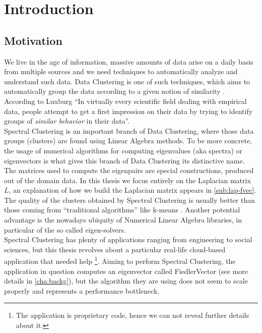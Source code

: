 \chapter{Introduction}

\section{Motivation}

We live in the age of information, massive amounts of data arise on a
daily basis from multiple sources and we need techniques to
automatically analyze and understand such data. Data Clustering is one
of such techniques, which aims to automatically group the data
according to a given notion of similarity \cite{pang06}. According to
Luxburg \cite{luxburg07} ``In virtually every  
scientific field dealing with empirical data, people attempt to get a
first impression on their data by
trying to identify groups of \emph{similar behavior} in their
data''. \\

Spectral Clustering is an important branch of Data Clustering, where
those data groups (clusters) are found using Linear Algebra
methods. To be more concrete, the usage of numerical algorithms for computing
eigenvalues (aka spectra) or eigenvectors is what gives this branch of
Data Clustering its distinctive  name. The matrices used to compute the
eigenpairs are special constructions, produced out of the domain
data. In this thesis we focus entirely on the \gls{Laplacian} matrix
$L$, an explanation of how we build the 
\gls{Laplacian} matrix appears in \cref{sub:lap-fvec}. \\

The quality of the clusters obtained by Spectral Clustering 
is usually better than those coming from ``traditional algorithms''
like k-means \cite{luxburg07}. Another potential advantage is the
nowadays ubiquity of Numerical Linear Algebra libraries, in particular
of the so called eigen-solvers. \\

Spectral Clustering has plenty of applications ranging from
engineering to social sciences, but this  
thesis revolves about a particular real-life cloud-based application
that needed help \footnote{The application is proprietary code, hence
  we can not 
  reveal further details about it.}. Aiming to perform Spectral
Clustering, the application in question
computes an eigenvector called \gls{FiedlerVector} (see more
details in \cref{cha:backg}), but the algorithm they are using does
not seem to scale properly and represents a performance bottleneck. 

